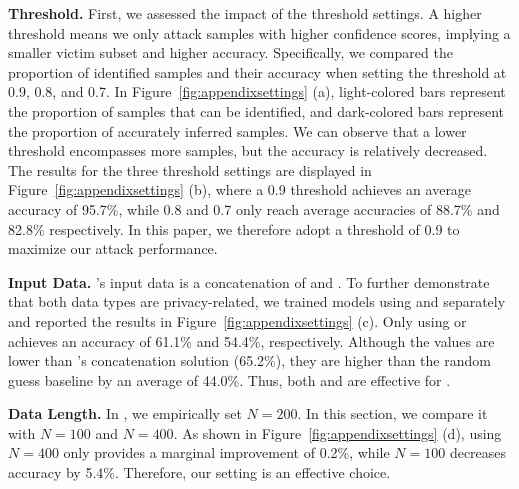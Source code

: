 \noindent \textbf{Threshold.}
First, we assessed the impact of the threshold settings. A higher threshold means we only attack samples with higher confidence scores, implying a smaller victim subset and higher accuracy. Specifically, we compared the proportion of identified samples and their accuracy when setting the threshold at 0.9, 0.8, and 0.7. In Figure~\ref{fig:appendixsettings} (a), light-colored bars represent the proportion of samples that can be identified, and dark-colored bars represent the proportion of accurately inferred samples. We can observe that a lower threshold encompasses more samples, but the accuracy is relatively decreased. The results for the three threshold settings are displayed in Figure~\ref{fig:appendixsettings} (b), where a 0.9 threshold achieves an average accuracy of 95.7\%, while 0.8 and 0.7 only reach average accuracies of 88.7\% and 82.8\% respectively. In this paper, we therefore adopt a threshold of 0.9 to maximize our attack performance.


\noindent \textbf{Input Data.}
\tool's input data is a concatenation of \mini and \op. To further demonstrate that both data types are privacy-related, we trained models using \mini and \op separately and reported the results in Figure~\ref{fig:appendixsettings} (c). Only using \mini or \op achieves an accuracy of 61.1\% and 54.4\%, respectively. Although the values are lower than \tool's concatenation solution (65.2\%), they are higher than the random guess baseline by an average of 44.0\%. Thus, both \mini and \op are effective for \tool.


\noindent \textbf{Data Length.}
In \tool, we empirically set $N=200$. In this section, we compare it with $N=100$ and $N=400$. As shown in Figure~\ref{fig:appendixsettings} (d), using 
$N=400$ only provides a marginal improvement of 0.2\%, while $N=100$ decreases accuracy by 5.4\%. Therefore, our setting is an effective choice.

